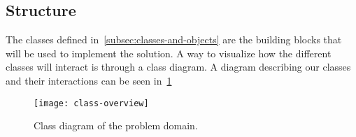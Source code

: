 \subsection{Structure}\label{subsec:structure}

The classes defined in~\ref{subsec:classes-and-objects} are the building blocks that will be used
to implement the solution.
A way to visualize how the different classes will interact is through a class diagram.
A diagram describing our classes and their interactions can be seen in~\ref{fig:pda-class-diagram}

\begin{figure}[h]
    \centering
    \texttt{[image: class-overview]}
    \caption{Class diagram of the problem domain.}\label{fig:pda-class-diagram}
\end{figure}
